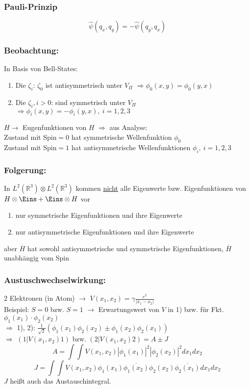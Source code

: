\documentclass[twoside,a4paper]{scrartcl}
\newcommand{\R}{\mathbb{R}}
\renewcommand{\1}{\mathds{1}}
\newcommand{\Ra}{\Rightarrow}
\newcommand{\ra}{\rightarrow}
\renewcommand{\R}{\mathbb{R}}
\begin{document}
\subsubsection*{Pauli-Prinzip}
$$\hat \psi(q_x,q_y)=- \hat \psi(q_y,q_x)$$
\subsubsection*{Beobachtung:}
In Basis von Bell-States:\\
\begin{enumerate}
\item Die $\zeta_i$: $\zeta_0$ ist antisymmetrisch unter $V_\Pi$ $\Ra \phi_0(x,y)=\phi_0(y,x)$
\item Die $\zeta_i, i>0$: sind symmetrisch unter $V_\Pi$ $\Ra \phi_i(x,y)=-\phi_i(y,x), \ i=1,2,3$
\end{enumerate}
$H \ra$ Eugenfunktionen von $H$ $\Ra$ aus Analyse: \\
Zustand mit Spin$=0$ hat symmetrische Wellenfunktion $\phi_0$\\
Zustand mit Spin$=1$ hat antisymmetrische Wellenfunktionen $\phi_i, \ i=1,2,3$\\
\subsubsection*{Folgerung:}
In $L^2(\R^3) \otimes L^2(\R^3)$ kommen \underline{nicht} alle Eigenwerte bzw. Eigenfunktionen von $H \otimes \Eins+\Eins \otimes H$ vor
\begin{enumerate}
\item nur symmetrische Eigenfunktionen und ihre Eigenwerte
\item nur antisymmetrische Eigenfunktionen und ihre Eigenwerte
\end{enumerate}
aber $\overline{H}$ hat sowohl antisymmetrische und symmetrische Eigenfunktionen, $\overline{H}$ unabhängig vom Spin
\subsubsection*{Austuschwechselwirkung:}
2 Elektronen (in Atom) $\ra$ $V(x_1,x_2)=\gamma\frac{e^2}{|x_1-x_2|}$\\
Beispiel: $S=0$ bzw. $S=1$ $\ra$ Erwartungswert von $V$ in 1) bzw. für Fkt. $\phi_1(x_1)\cdot \phi_2(x_2)$\\
$\Ra$ 1), 2): $\frac{1}{\sqrt{2}}(\phi_1(x_1)\phi_2(x_2)\pm\phi_1(x_2)\phi_2(x_1))$\\
$\Ra$ $(1 | V(x_1,x_2) 1)$ bzw. $(2 | V(x_1,x_2) 2)=A\pm J$
$$A=\int \int V(x_1,x_2)|\phi_1(x_1)|^2|\phi_2(x_2)|^2dx_1dx_2$$
$$J=\int \int V(x_1,x_2)\phi_1(x_1)\overline{\phi_1(x_2)}\phi_2(x_2)\overline{\phi_2(x_1)}dx_1dx_2$$
$J$ heißt auch das Austauschintegral.
\end{document}
